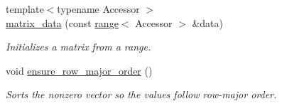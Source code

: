 \begin{DoxyCompactItemize}
{\footnotesize template$<$typename Accessor $>$ }\\\hyperlink{structgko_1_1matrix__data_a380d2b8207621f3c997804afa6d729af}{matrix\+\_\+data} (const \hyperlink{classgko_1_1range}{range}$<$ Accessor $>$ \&data)
\begin{DoxyCompactList}\small\item\em Initializes a matrix from a range. \end{DoxyCompactList}\item 
\mbox{\label{structgko_1_1matrix__data_ac83a3b5d892fbd132fd9a7f50b0f83b8}} 
void \hyperlink{structgko_1_1matrix__data_ac83a3b5d892fbd132fd9a7f50b0f83b8}{ensure\+\_\+row\+\_\+major\+\_\+order} ()
\begin{DoxyCompactList}\small\item\em Sorts the nonzero vector so the values follow row-\/major order. \end{DoxyCompactList}\end{DoxyCompactItemize}
